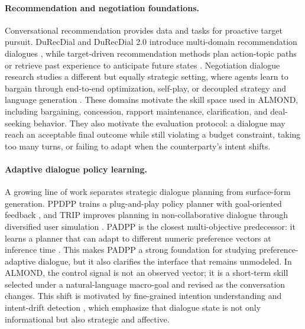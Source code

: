 \documentclass[conference]{IEEEtran}
\begin{document}
\paragraph{Recommendation and negotiation foundations.}
Conversational recommendation provides data and tasks for proactive target
pursuit. DuRecDial and DuRecDial 2.0 introduce multi-domain recommendation
dialogues
\cite{liu-etal-2020-towards-conversational,liu-etal-2021-durecdial}, while
target-driven recommendation methods plan action-topic paths or retrieve past
experience to anticipate future states
\cite{wang2022follow,dao-etal-2024-experience}. Negotiation dialogue research
studies a different but equally strategic setting, where agents learn to bargain
through end-to-end optimization, self-play, or decoupled strategy and language
generation \cite{lewis-etal-2017-deal,he-etal-2018-decoupling}. These domains
motivate the skill space used in ALMOND, including bargaining, concession,
rapport maintenance, clarification, and deal-seeking behavior. They also
motivate the evaluation protocol: a dialogue may reach an acceptable final
outcome while still violating a budget constraint, taking too many turns, or
failing to adapt when the counterparty's intent shifts.

\paragraph{Adaptive dialogue policy learning.}
A growing line of work separates strategic dialogue planning from surface-form
generation. PPDPP trains a plug-and-play policy planner with goal-oriented
feedback \cite{deng2024plug}, and TRIP improves planning in non-collaborative
dialogue through diversified user simulation \cite{zhang-etal-2024-strength}.
PADPP is the closest multi-objective predecessor: it learns a planner that can
adapt to different numeric preference vectors at inference time
\cite{dao-liao-2025-one}. This makes PADPP a strong foundation for studying
preference-adaptive dialogue, but it also clarifies the interface that remains
unmodeled. In ALMOND, the control signal is not an observed vector; it is a
short-term skill selected under a natural-language macro-goal and revised as
the conversation changes. This shift is motivated by fine-grained intention
understanding and intent-drift detection
\cite{liang-etal-2025-intentionframe,wang2025detecting}, which emphasize that
dialogue state is not only informational but also strategic and affective.
\end{document}
